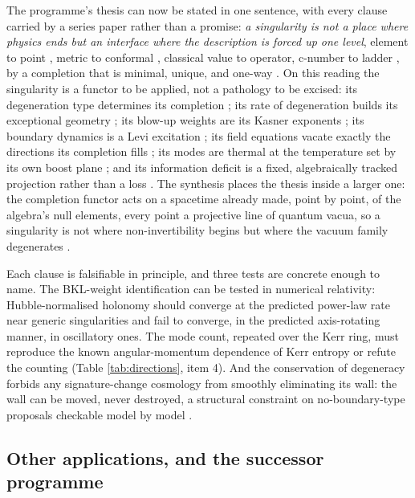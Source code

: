 \documentclass[11pt]{article}
\theoremstyle{definition}
\begin{document}
The programme's thesis can now be stated in one sentence, with every clause carried by a series paper rather than a promise: \emph{a singularity is not a place where physics ends but an interface where the description is forced up one level}, element to point \cite{ButlerT1}, metric to conformal \cite{ButlerT4, ButlerT6}, classical value to operator, c-number to ladder \cite{ButlerT3, ButlerT5}, by a completion that is minimal, unique, and one-way \cite{ButlerT1}. On this reading the singularity is a functor to be applied, not a pathology to be excised: its degeneration type determines its completion \cite{ButlerT1}; its rate of degeneration builds its exceptional geometry \cite{ButlerT4}; its blow-up weights are its Kasner exponents \cite{ButlerT6}; its boundary dynamics is a Levi excitation \cite{ButlerT6}; its field equations vacate exactly the directions its completion fills \cite{ButlerT10}; its modes are thermal at the temperature set by its own boost plane \cite{ButlerT5}; and its information deficit is a fixed, algebraically tracked projection rather than a loss \cite{ButlerT5}. The synthesis places the thesis inside a larger one: the completion functor acts on a spacetime already made, point by point, of the algebra's null elements, every point a projective line of quantum vacua, so a singularity is not where non-invertibility begins but where the vacuum family degenerates \cite{ButlerT16}.

Each clause is falsifiable in principle, and three tests are concrete enough to name. The BKL-weight identification can be tested in numerical relativity: Hubble-normalised holonomy should converge at the predicted power-law rate near generic singularities and fail to converge, in the predicted axis-rotating manner, in oscillatory ones. The mode count, repeated over the Kerr ring, must reproduce the known angular-momentum dependence of Kerr entropy or refute the counting (Table \ref{tab:directions}, item 4). And the conservation of degeneracy forbids any signature-change cosmology from smoothly eliminating its wall: the wall can be moved, never destroyed, a structural constraint on no-boundary-type proposals checkable model by model \cite{ButlerT4}.

\subsection{Other applications, and the successor programme}
\end{document}
